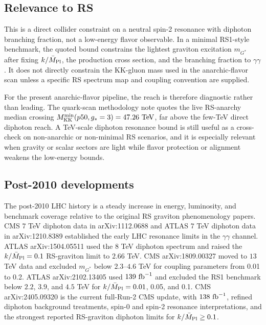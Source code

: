 \subsection*{Relevance to RS}
This is a direct collider constraint on a neutral spin-2 resonance with
diphoton branching fraction, not a low-energy flavor observable.  In a minimal
RS1-style benchmark, the quoted bound constrains the lightest graviton
excitation \(m_{G^*}\) after fixing \(k/\bar M_{\rm Pl}\), the production
cross section, and the branching fraction to \(\gamma\gamma\).  It does not
directly constrain the KK-gluon mass used in the anarchic-flavor scan unless a
specific RS spectrum map and coupling convention are supplied.

For the present anarchic-flavor pipeline, the reach is therefore diagnostic
rather than leading.  The quark-scan methodology note quotes the live
RS-anarchy median crossing
\(M_{\rm KK}^{\min}(p50,g_* = 3)=47.26~{\rm TeV}\), far above the few-TeV
direct diphoton reach.  A TeV-scale diphoton resonance bound is still useful as
a cross-check on non-anarchic or non-minimal RS scenarios, and it is especially
relevant when gravity or scalar sectors are light while flavor protection or
alignment weakens the low-energy bounds.

\subsection*{Post-2010 developments}
The post-2010 LHC history is a steady increase in energy, luminosity, and
benchmark coverage relative to the original RS graviton phenomenology papers.
CMS \(7\) TeV diphoton data in arXiv:1112.0688 and ATLAS \(7\) TeV diphoton
data in arXiv:1210.8389 established the early LHC resonance limits in the
\(\gamma\gamma\) channel.  ATLAS arXiv:1504.05511 used the \(8\) TeV
diphoton spectrum and raised the \(k/\bar M_{\rm Pl}=0.1\) RS-graviton
limit to \(2.66\) TeV.  CMS arXiv:1809.00327 moved to \(13\) TeV data and
excluded \(m_{G^*}\) below \(2.3\)--\(4.6\) TeV for coupling parameters from
0.01 to 0.2.  ATLAS arXiv:2102.13405 used \(139~{\rm fb}^{-1}\) and excluded
the RS1 benchmark below \(2.2\), \(3.9\), and \(4.5\) TeV for
\(k/\bar M_{\rm Pl}=0.01\), 0.05, and 0.1.  CMS arXiv:2405.09320 is the
current full-Run-2 CMS update, with \(138~{\rm fb}^{-1}\), refined diphoton
background treatments, spin-0 and spin-2 resonance interpretations, and the
strongest reported RS-graviton diphoton limits for \(k/\bar M_{\rm Pl}\ge
0.1\).

